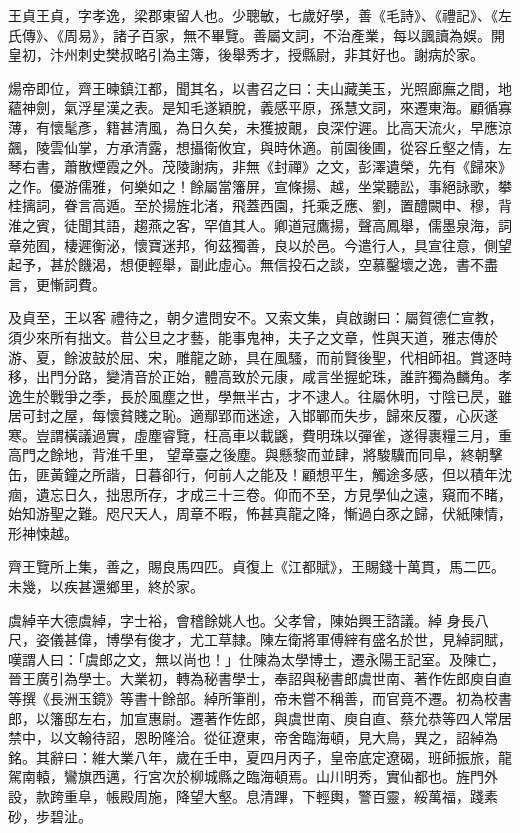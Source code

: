 \begin{pinyinscope}
 王貞王貞，字孝逸，梁郡東留人也。少聰敏，七歲好學，善《毛詩》、《禮記》、《左氏傳》、《周易》，諸子百家，無不畢覽。善屬文詞，不治產業，每以諷讀為娛。開皇初，汴州刺史樊叔略引為主簿，後舉秀才，授縣尉，非其好也。謝病於家。



 煬帝即位，齊王暕鎮江都，聞其名，以書召之曰：夫山藏美玉，光照廊廡之間，地蘊神劍，氣浮星漢之表。是知毛遂穎脫，義感平原，孫慧文詞，來遷東海。顧循寡薄，有懷髦彥，籍甚清風，為日久矣，未獲披覿，良深佇遲。比高天流火，早應涼
 飆，陵雲仙掌，方承清露，想攝衛攸宜，與時休適。前園後圃，從容丘壑之情，左琴右書，蕭散煙霞之外。茂陵謝病，非無《封禪》之文，彭澤遺榮，先有《歸來》之作。優游儒雅，何樂如之！餘屬當籓屏，宣條揚、越，坐棠聽訟，事絕詠歌，攀桂摛詞，眷言高遁。至於揚旌北渚，飛蓋西園，托乘乏應、劉，置醴闕申、穆，背淮之賓，徒聞其語，趨燕之客，罕值其人。卿道冠鷹揚，聲高鳳舉，儒墨泉海，詞章苑囿，棲遲衡泌，懷寶迷邦，徇茲獨善，良以於邑。今遣行人，具宣往意，側望起予，甚於饑渴，想便輕舉，副此虛心。無信投石之談，空慕鑿壞之逸，書不盡言，更慚詞費。



 及貞至，王以客
 禮待之，朝夕遣問安不。又索文集，貞啟謝曰：屬賀德仁宣教，須少來所有拙文。昔公旦之才藝，能事鬼神，夫子之文章，性與天道，雅志傳於游、夏，餘波鼓於屈、宋，雕龍之跡，具在風騷，而前賢後聖，代相師祖。賞逐時移，出門分路，變清音於正始，體高致於元康，咸言坐握蛇珠，誰許獨為麟角。孝逸生於戰爭之季，長於風塵之世，學無半古，才不逮人。往屬休明，寸陰已昃，雖居可封之屋，每懷貧賤之恥。適鄢郢而迷途，入邯鄲而失步，歸來反覆，心灰遂寒。豈謂橫議過實，虛塵睿覽，枉高車以載鼷，費明珠以彈雀，遂得裹糧三月，重高門之餘地，背淮千里，
 望章臺之後塵。與懸黎而並肆，將駿驥而同阜，終朝擊缶，匪黃鐘之所諧，日暮卻行，何前人之能及！顧想平生，觸途多感，但以積年沈痼，遺忘日久，拙思所存，才成三十三卷。仰而不至，方見學仙之遠，窺而不睹，始知游聖之難。咫尺天人，周章不暇，怖甚真龍之降，慚過白豕之歸，伏紙陳情，形神悚越。



 齊王覽所上集，善之，賜良馬四匹。貞復上《江都賦》，王賜錢十萬貫，馬二匹。未幾，以疾甚還鄉里，終於家。



 虞綽辛大德虞綽，字士裕，會稽餘姚人也。父孝曾，陳始興王諮議。綽
 身長八尺，姿儀甚偉，博學有俊才，尤工草隸。陳左衛將軍傅縡有盛名於世，見綽詞賦，嘆謂人曰：「虞郎之文，無以尚也！」仕陳為太學博士，遷永陽王記室。及陳亡，晉王廣引為學士。大業初，轉為秘書學士，奉詔與秘書郎虞世南、著作佐郎庾自直等撰《長洲玉鏡》等書十餘部。綽所筆削，帝未嘗不稱善，而官竟不遷。初為校書郎，以籓邸左右，加宣惠尉。遷著作佐郎，與虞世南、庾自直、蔡允恭等四人常居禁中，以文翰待詔，恩盼隆洽。從征遼東，帝舍臨海頓，見大鳥，異之，詔綽為銘。其辭曰：維大業八年，歲在壬申，夏四月丙子，皇帝底定遼碣，班師振旅，龍
 駕南轅，鸞旗西邁，行宮次於柳城縣之臨海頓焉。山川明秀，實仙都也。旌門外設，款跨重阜，帳殿周施，降望大壑。息清蹕，下輕輿，警百靈，綏萬福，踐素砂，步碧沚。




\end{pinyinscope}
